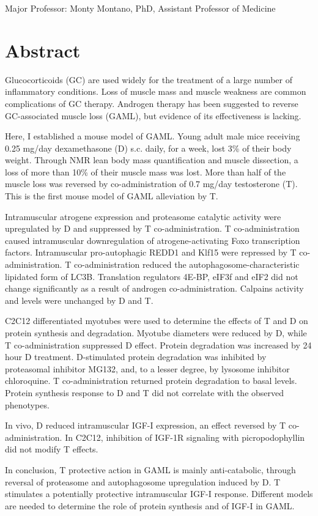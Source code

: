 \documentclass[12pt,english]{report}\usepackage[]{graphicx}\usepackage[]{color}
\begin{document}
Major Professor: Monty Montano, PhD, Assistant Professor of Medicine


\section{Abstract}

Glucocorticoids (GC) are used widely for the treatment of a large
number of inflammatory conditions. Loss of muscle mass and muscle
weakness are common complications of GC therapy. Androgen therapy
has been suggested to reverse GC-associated muscle loss (GAML), but
evidence of its effectiveness is lacking.

Here, I established a mouse model of GAML. Young adult male mice receiving
0.25 mg/day dexamethasone (D) s.c. daily, for a week, lost 3\% of
their body weight. Through NMR lean body mass quantification and muscle
dissection, a loss of more than 10\% of their muscle mass was lost.
More than half of the muscle loss was reversed by co-administration
of 0.7 mg/day testosterone (T). This is the first mouse model of GAML
alleviation by T.

Intramuscular atrogene expression and proteasome catalytic activity
were upregulated by D and suppressed by T co-administration. T co-administration
caused intramuscular downregulation of atrogene-activating Foxo transcription
factors. Intramuscular pro-autophagic REDD1 and Klf15 were repressed
by T co-administration. T co-administration reduced the autophagosome-characteristic
lipidated form of LC3B. Translation regulators 4E-BP, eIF3f and eIF2
did not change significantly as a result of androgen co-administration.
Calpains activity and levels were unchanged by D and T. 

C2C12 differentiated myotubes were used to determine the effects of
T and D on protein synthesis and degradation. Myotube diameters were
reduced by D, while T co-administration suppressed D effect. Protein
degradation was increased by 24 hour D treatment. D-stimulated protein
degradation was inhibited by proteasomal inhibitor MG132, and, to
a lesser degree, by lysosome inhibitor chloroquine. T co-administration
returned protein degradation to basal levels. Protein synthesis response
to D and T did not correlate with the observed phenotypes.

In vivo, D reduced intramuscular IGF-I expression, an effect reversed
by T co-administration. In C2C12, inhibition of IGF-1R signaling with
picropodophyllin did not modify T effects.

In conclusion, T protective action in GAML is mainly anti-catabolic,
through reversal of proteasome and autophagosome upregulation induced
by D. T stimulates a potentially protective intramuscular IGF-I response.
Different models are needed to determine the role of protein synthesis
and of IGF-I in GAML.\pagebreak{}
\end{document}
